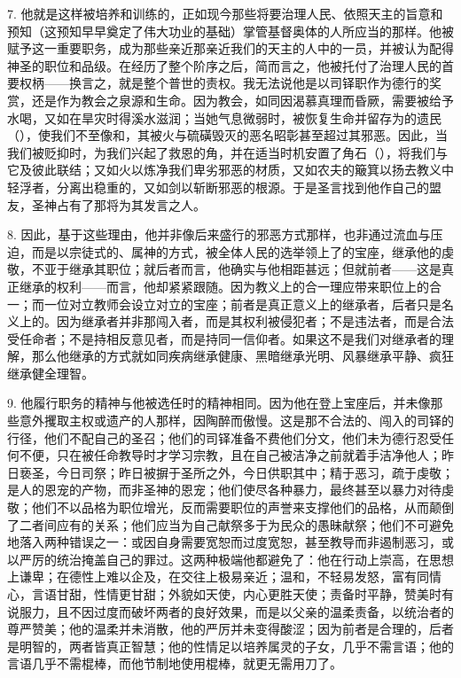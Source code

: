 7. 他就是这样被培养和训练的，正如现今那些将要治理人民、依照天主的旨意和预知（这预知早早奠定了伟大功业的基础）掌管基督奥体的人所应当的那样。他被赋予这一重要职务，成为那些亲近那亲近我们的天主的人中的一员，并被认为配得神圣的职位和品级。在经历了整个阶序之后，简而言之，他被托付了治理人民的首要权柄——换言之，就是整个普世的责权。我无法说他是以司铎职作为德行的奖赏，还是作为教会之泉源和生命。因为教会，如同因渴慕真理而昏厥，需要被给予水喝，又如在旱灾时得溪水滋润；当她气息微弱时，被恢复生命并留存为的遗民（），使我们不至像和，其被火与硫磺毁灭的恶名昭彰甚至超过其邪恶。因此，当我们被贬抑时，为我们兴起了救恩的角，并在适当时机安置了角石（），将我们与它及彼此联结；又如火以炼净我们卑劣邪恶的材质，又如农夫的簸箕以扬去教义中轻浮者，分离出稳重的，又如剑以斩断邪恶的根源。于是圣言找到他作自己的盟友，圣神占有了那将为其发言之人。\par

8. 因此，基于这些理由，他并非像后来盛行的邪恶方式那样，也非通过流血与压迫，而是以宗徒式的、属神的方式，被全体人民的选举领上了的宝座，继承他的虔敬，不亚于继承其职位；就后者而言，他确实与他相距甚远；但就前者——这是真正继承的权利——而言，他却紧紧跟随。因为教义上的合一理应带来职位上的合一；而一位对立教师会设立对立的宝座；前者是真正意义上的继承者，后者只是名义上的。因为继承者并非那闯入者，而是其权利被侵犯者；不是违法者，而是合法受任命者；不是持相反意见者，而是持同一信仰者。如果这不是我们对继承者的理解，那么他继承的方式就如同疾病继承健康、黑暗继承光明、风暴继承平静、疯狂继承健全理智。\par

9. 他履行职务的精神与他被选任时的精神相同。因为他在登上宝座后，并未像那些意外攫取主权或遗产的人那样，因陶醉而傲慢。这是那不合法的、闯入的司铎的行径，他们不配自己的圣召；他们的司铎准备不费他们分文，他们未为德行忍受任何不便，只在被任命教导时才学习宗教，且在自己被洁净之前就着手洁净他人；昨日亵圣，今日司祭；昨日被摒于圣所之外，今日供职其中；精于恶习，疏于虔敬；是人的恩宠的产物，而非圣神的恩宠；他们使尽各种暴力，最终甚至以暴力对待虔敬；他们不以品格为职位增光，反而需要职位的声誉来支撑他们的品格，从而颠倒了二者间应有的关系；他们应当为自己献祭多于为民众的愚昧献祭；他们不可避免地落入两种错误之一：或因自身需要宽恕而过度宽恕，甚至教导而非遏制恶习，或以严厉的统治掩盖自己的罪过。这两种极端他都避免了：他在行动上崇高，在思想上谦卑；在德性上难以企及，在交往上极易亲近；温和，不轻易发怒，富有同情心，言语甘甜，性情更甘甜；外貌如天使，内心更胜天使；责备时平静，赞美时有说服力，且不因过度而破坏两者的良好效果，而是以父亲的温柔责备，以统治者的尊严赞美；他的温柔并未消散，他的严厉并未变得酸涩；因为前者是合理的，后者是明智的，两者皆真正智慧；他的性情足以培养属灵的子女，几乎不需言语；他的言语几乎不需棍棒，而他节制地使用棍棒，就更无需用刀了。\par

